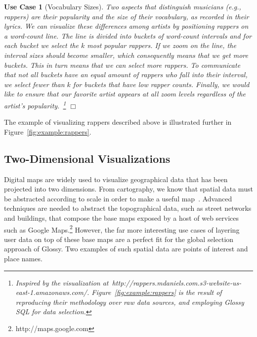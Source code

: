 \documentclass[11pt, oneside]{report}
\newtheorem{example}{Use Case}
\newcommand{\mathendbox}{\hfill$\Box$}
\begin{document}
{\begin{example}[Vocabulary Sizes]\label{ex:rappers}
Two aspects that distinguish musicians (e.g., rappers) are their popularity and the size of their vocabulary, as recorded in their lyrics. We can visualize these differences among artists by positioning rappers on a word-count line. The line is divided into buckets of word-count intervals and for each bucket we select the $k$ most popular rappers. If we zoom on the line, the interval sizes should become smaller, which consequently means that we get more buckets. This in turn means that we can select more rappers. To communicate that not all buckets have an equal amount of rappers who fall into their interval, we select fewer than $k$ for buckets that have low rapper counts. Finally, we would like to ensure that our favorite artist appears at all zoom levels regardless of the artist's popularity.~\footnote{Inspired by the visualization at~http://rappers.mdaniels.com.s3-website-us-east-1.amazonaws.com/. Figure~\ref{fig:example:rappers} is the result of reproducing their methodology over raw data sources, and employing Glossy SQL for data selection.} \mathendbox
\end{example}

The example of visualizing rappers described above is illustrated further in Figure~\ref{fig:example:rappers}.

\subsection{Two-Dimensional Visualizations}
\label{sec:examples:two:dimensional}

Digital maps are widely used to visualize geographical data that has been projected into two dimensions. From cartography, we know that spatial data must be abstracted according to scale in order to make a useful map~\cite{NeunBW09:GeneralizationWeb,WareJT03:GeneralizationMeta}. Advanced techniques are needed to abstract the topographical data, such as street networks and buildings, that compose the base maps exposed by a host of web services such as Google Maps.\footnote{http://maps.google.com} However, the far more interesting use cases of layering user data on top of these base maps are a perfect fit for the global selection approach of Glossy. Two examples of such spatial data are points of interest and place names. 

}
\end{document}
